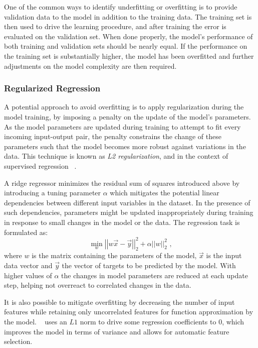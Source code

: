 One of the common ways to identify underfitting or overfitting is to provide validation data to the model in addition to the training data.
The training set is then used to drive the learning procedure, and after training the error is evaluated on the validation set.
When done properly, the model's performance of both training and validation sets should be nearly equal.
If the performance on the training set is substantially higher, the model has been overfitted and further adjustments on the model complexity are then required.

\subsubsection*{Regularized Regression}

A potential approach to avoid overfitting is to apply regularization during the model training, by imposing a penalty on the update of the model's parameters.
As the model parameters are updated during training to attempt to fit every incoming input-output pair, the penalty constrains the change of these parameters such that the model becomes more robust against variations in the data.
This technique is known as \textit{L2 regularization}, and in the context of supervised regression ~\cite{MIT:Rifkin:Regularized_Least_Squares}.

A ridge regressor minimizes the residual sum of squares introduced above by introducing a tuning parameter \(\alpha\) which mitigates the potential linear dependencies between different input variables in the dataset.
In the presence of such dependencies, parameters might be updated inappropriately during training in response to small changes in the model or the data.
The regression task is formulated as:
\begin{equation}
    \min _w \left|\left| w \vec{x} - \vec{y} \right|\right|_2^2 + \alpha \left|\left| w \right|\right|_2^2 \text{ ,}
    \label{equation:ridge_regression_regularization}
\end{equation}
where \(w\) is the matrix containing the parameters of the model, \(\vec{x}\) is the input data vector and \(\vec{y}\) the vector of targets to be predicted by the model.
With higher values of \(\alpha\) the changes in model parameters are reduced at each update step, helping not overreact to correlated changes in the data.

It is also possible to mitigate overfitting by decreasing the number of input features while retaining only uncorrelated features for function approximation by the model.
~\cite{JRSS:Tibshirani:Regression_Shrinkage_Selection_Via_Lasso} uses an \(L1\) norm to drive some regression coefficients to \(0\), which improves the model in terms of variance and allows for automatic feature selection.

